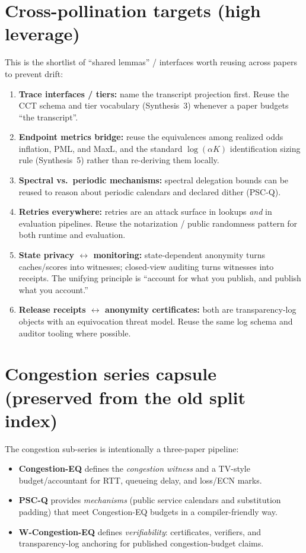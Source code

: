 \documentclass[11pt]{article}
\begin{document}
\section{Cross-pollination targets (high leverage)}
This is the shortlist of ``shared lemmas'' / interfaces worth reusing across papers to prevent drift:
\begin{enumerate}[leftmargin=*]
\item \textbf{Trace interfaces / tiers:} name the transcript projection first. Reuse the CCT schema and tier vocabulary (Synthesis~3) whenever a paper budgets ``the transcript''.
\item \textbf{Endpoint metrics bridge:} reuse the equivalences among realized odds inflation, PML, and MaxL, and the standard $\log(\alpha K)$ identification sizing rule (Synthesis~5) rather than re-deriving them locally.
\item \textbf{Spectral vs.\ periodic mechanisms:} spectral delegation bounds can be reused to reason about periodic calendars and declared dither (PSC-Q).
\item \textbf{Retries everywhere:} retries are an attack surface in lookups \emph{and} in evaluation pipelines.
  Reuse the notarization / public randomness pattern for both runtime and evaluation.
\item \textbf{State privacy $\leftrightarrow$ monitoring:} state-dependent anonymity turns caches/scores into witnesses; closed-view auditing turns witnesses into receipts.
  The unifying principle is ``account for what you publish, and publish what you account.''
\item \textbf{Release receipts $\leftrightarrow$ anonymity certificates:} both are transparency-log objects with an equivocation threat model.
  Reuse the same log schema and auditor tooling where possible.
\end{enumerate}


\section{Congestion series capsule (preserved from the old split index)}
The congestion sub-series is intentionally a three-paper pipeline:
\begin{itemize}[leftmargin=*]
\item \textbf{Congestion-EQ} defines the \emph{congestion witness} and a TV-style budget/accountant for RTT, queueing delay, and loss/ECN marks.
\item \textbf{PSC-Q} provides \emph{mechanisms} (public service calendars and substitution padding) that meet Congestion-EQ budgets in a compiler-friendly way.
\item \textbf{W-Congestion-EQ} defines \emph{verifiability}: certificates, verifiers, and transparency-log anchoring for published congestion-budget claims.
\end{itemize}
\end{document}
